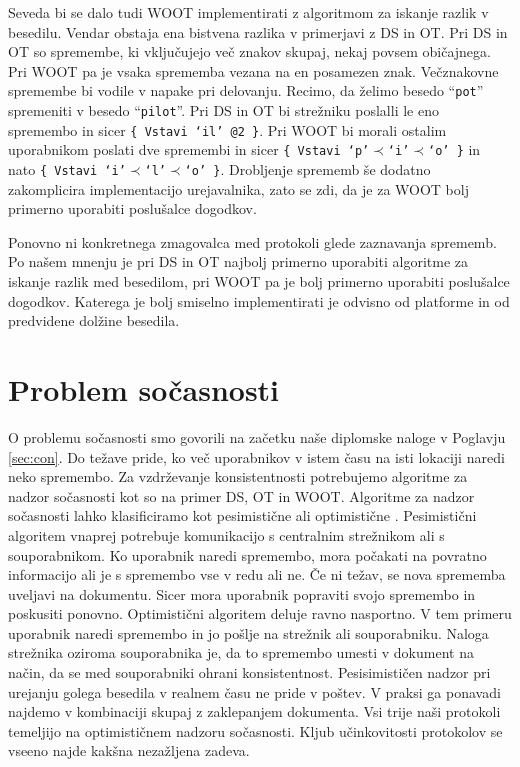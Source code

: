 \documentclass[a4paper, 12pt, twoside]{book}
\begin{document}
Seveda bi se dalo tudi WOOT implementirati z algoritmom za iskanje razlik v besedilu. Vendar obstaja ena bistvena razlika v primerjavi z DS in OT. Pri DS in OT so spremembe, ki vključujejo več znakov skupaj, nekaj povsem običajnega. Pri WOOT pa je vsaka sprememba vezana na en posamezen znak. Večznakovne spremembe bi vodile v napake pri delovanju. Recimo, da želimo besedo “{\tt pot}” spremeniti v besedo “{\tt pilot}”. Pri DS in OT bi strežniku poslalli le eno spremembo in sicer {\tt \{ Vstavi ‘il’ @2 \}}. Pri WOOT bi morali ostalim uporabnikom poslati dve spremembi in sicer {\tt \{ Vstavi ‘p’$\prec$‘i’$\prec$‘o’ \}} in nato {\tt \{ Vstavi ‘i’$\prec$‘l’$\prec$‘o’ \}}. Drobljenje sprememb še dodatno zakomplicira implementacijo urejavalnika, zato se zdi, da je za WOOT bolj primerno uporabiti poslušalce dogodkov.

Ponovno ni konkretnega zmagovalca med protokoli glede zaznavanja sprememb. Po našem mnenju je pri DS in OT najbolj primerno uporabiti algoritme za iskanje razlik med besedilom, pri WOOT pa je bolj primerno uporabiti poslušalce dogodkov. Katerega je bolj smiselno implementirati je odvisno od platforme in od predvidene dolžine besedila.

\section{Problem sočasnosti}

O problemu sočasnosti smo govorili na začetku naše diplomske naloge v Poglavju \ref{sec:con}. Do težave pride, ko več uporabnikov v istem času na isti lokaciji naredi neko spremembo. Za vzdrževanje konsistentnosti potrebujemo algoritme za nadzor sočasnosti kot so na primer DS, OT in WOOT.  Algoritme za nadzor sočasnosti lahko klasificiramo kot pesimistične ali optimistične \cite{hllbw}. Pesimistični algoritem vnaprej potrebuje komunikacijo s centralnim strežnikom ali s souporabnikom. Ko uporabnik naredi spremembo, mora počakati na povratno informacijo ali je s spremembo vse v redu ali ne. Če ni težav, se nova sprememba uveljavi na dokumentu. Sicer mora uporabnik popraviti svojo spremembo in poskusiti ponovno. Optimistični algoritem deluje ravno nasportno. V tem primeru uporabnik naredi spremembo in jo pošlje na strežnik ali souporabniku. Naloga strežnika oziroma souporabnika je, da to spremembo umesti v dokument na način, da se med souporabniki ohrani konsistentnost. Pesisimističen nadzor pri urejanju golega besedila v realnem času ne pride v poštev. V praksi ga ponavadi najdemo v kombinaciji skupaj z zaklepanjem dokumenta. Vsi trije naši protokoli temeljijo na optimističnem nadzoru sočasnosti. Kljub učinkovitosti protokolov se vseeno najde kakšna nezažljena zadeva.
\end{document}
